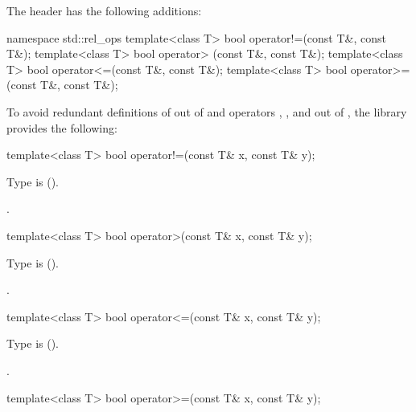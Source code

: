 \pnum
The header  has the following additions:

\begin{codeblock}
namespace std::rel_ops {
  template<class T> bool operator!=(const T&, const T&);
  template<class T> bool operator> (const T&, const T&);
  template<class T> bool operator<=(const T&, const T&);
  template<class T> bool operator>=(const T&, const T&);
}
\end{codeblock}

\pnum
To avoid redundant definitions of  out of 
and operators \tcode{>}, \tcode{<=}, and \tcode{>=} out of ,
the library provides the following:

%
\begin{itemdecl}
template<class T> bool operator!=(const T& x, const T& y);
\end{itemdecl}

\begin{itemdescr}
\pnum
\requires
Type  is  ().

\pnum
\returns
{}.
\end{itemdescr}

%
\begin{itemdecl}
template<class T> bool operator>(const T& x, const T& y);
\end{itemdecl}

\begin{itemdescr}
\pnum
\requires
Type  is  ().

\pnum
\returns
{}.
\end{itemdescr}

%
\begin{itemdecl}
template<class T> bool operator<=(const T& x, const T& y);
\end{itemdecl}

\begin{itemdescr}
\pnum
\requires
Type  is  ().

\pnum
\returns
{}.
\end{itemdescr}

%
\begin{itemdecl}
template<class T> bool operator>=(const T& x, const T& y);
\end{itemdecl}

